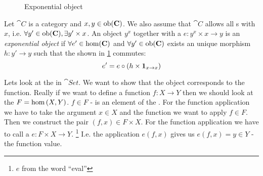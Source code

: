\begin{definition}[Exponential]
\label{def:exponential}
\begin{figure}
  \centering
  \caption{Exponential object}
  \label{fig:exponential}
\end{figure}
Let $\cat{C}$ is a category and $x, y \in \mathrm{ob}(\mathbf{C})$. We also assume
that $\cat{C}$ allows all s with $x$, i.e.
$\forall y' \in \mathrm{ob}(\mathbf{C}), \exists y' \times x$. An object $y^x$
together with a  $e: y^x \times x \to y$ is 
an \textit{exponential object} if $\forall e' \in \mathrm{hom}(\mathbf{C})$ and
$\forall y' \in \mathrm{ob}(\mathbf{C})$ exists an
unique morphism $h: y' \to y$ such that the
 shown in \cref{fig:exponential}
commutes:
\[
e' = e \circ \left(h \times \mathbf{1}_{ x \to x } \right)
\]
\end{definition}

\begin{example}
\label{ex:exponential_set}
Lets look at the  in $\cat{Set}$. We want
to show that the object corresponds to the function. Really if we want
to define a function $f: X \to Y$ then we should look at the
 $F = \catmset{X}{Y}$. $f \in F$ - is an element of the
. For the function application we have to take
the argument $x 
\in X$ and the function we want to apply $f \in F$. Then we construct
the pair $(f,x) \in F \times X$. For the function application we have
to call a  $e: F \times X \to Y$.
\footnote{$e$ from the word ``eval''}
I.e. the
application $e(f, x)$ gives us $e(f, x) = y \in Y$ - the function
value. 
\end{example}

